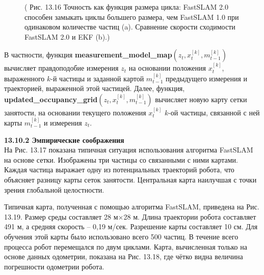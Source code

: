 \documentclass[10pt,a4paper]{article}
\begin{document}
\begin{figure}[H]
	\caption{ ( Рис. 13.16 Точность как функция размера цикла: FastSLAM 2.0 способен замыкать циклы большего размера, чем FastSLAM 1.0 при одинаковом количестве частиц (a).  Сравнение скорости сходимости FastSLAM 2.0 и EKF (b).) }
	\label{fig:1316orig}
\end{figure}

В частности, функция  \textbf{measurement\_model\_map}$(z_t,x_t^{[k]},m_{t-1}^{[k]})$
вычисляет правдоподобие измерения $z_t$ на основании положения $x_t^{[k]}$, выраженного $k$-й частицы и заданной картой $m_{t-1}^{[k]}$ предыдущего измерения и траекторией, выраженной этой частицей.   Далее, функция, \textbf{updated\_occupancy\_grid}$(z_t,x_t^{[k]},m_{t-1}^{[k]})$ вычисляет новую карту сетки занятости, на основании текущего положения $x_t^{[k]}$ $k$-ой частицы, связанной с ней карты $m_{t-1}^{[k]}$ и измерения $z_t$.

\textbf{13.10.2	Эмпирические соображения}\\

На Рис. 13.17 показана типичная ситуация использования алгоритма FastSLAM на основе сетки. Изображены три частицы со связанными с ними картами. Каждая частица выражает одну из потенциальных траекторий робота, что объясняет разницу карты сеток занятости. Центральная карта наилучшая с точки зрения глобальной целостности.

Типичная карта, полученная с помощью алгоритма FastSLAM, приведена на Рис. 13.19. Размер среды составляет 28 м$\times$28 м. Длина траектории робота составляет 491 м, а средняя скорость – 0,19 м/сек. Разрешение карты составляет 10 см. Для обучения этой карты было использовано всего 500 частиц. В течение всего процесса робот перемещался по двум циклами. Карта, вычисленная только на основе данных одометрии, показана на Рис. 13.18, где чётко видна величина погрешности одометрии робота. 
\end{document}
